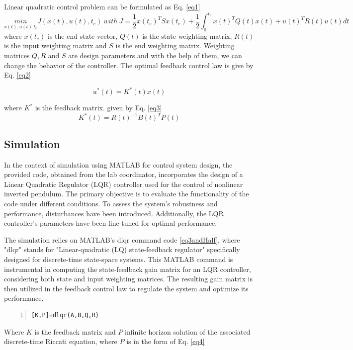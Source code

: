 Linear quadratic control problem can be formulated as Eq. \ref{eq1}
\begin{equation}\label{eq1}
\underset{x(t),u(t).t_e}{min}J(x(t),u(t),t_e)\: with \: J=\frac{1}{2}x(t_e)^TSx(t_e)+\frac{1}{2}\int_{0}^{t_e}x(t)^TQ(t)x(t)+u(t)^TR(t)u(t)dt
\end{equation}
where $x(t_e)$ is the end state vector, $Q(t)$ is the state weighting matrix, $R(t)$ is the input weighting matrix and $S$ is the end weighting matrix. Weighting matrices $Q,R$ and $S$ are design parameters and with the help of them, we can change the behavior of the controller. The optimal feedback control law is give by Eq. \ref{eq2} \cite{lqrLecture}

\begin{equation}\label{eq2}
u^*(t)=K^*(t)x(t)
\end{equation}

where $K^*$ is the feedback matrix. given by Eq. \ref{eq3} \cite{lqrLecture}
\begin{equation}\label{eq3}
K^*(t)=R(t)^{-1}B(t)^TP(t)
\end{equation}

\subsection{Simulation}
In the context of simulation using MATLAB for control system design, the provided code, obtained from the lab coordinator, incorporates the design of a Linear Quadratic Regulator (LQR) controller used for the control of nonlinear inverted pendulum. The primary objective is to evaluate the functionality of the code under different conditions. To assess the system's robustness and performance, disturbances have been introduced. Additionally, the LQR controller's parameters have been fine-tuned for optimal performance.

The simulation relies on MATLAB's dlqr command code \ref{eq3andHalf}, where "dlqr" stands for "Linear-quadratic (LQ) state-feedback regulator" specifically designed for discrete-time state-space systems. This MATLAB command is instrumental in computing the state-feedback gain matrix for an LQR controller, considering both state and input weighting matrices. The resulting gain matrix is then utilized in the feedback control law to regulate the system and optimize its performance. 
\begin{lstlisting}[numbers=left,label=eq3andHalf,caption={Discrete linear quadratic regulator implementation in MATLAB.},captionpos=b]
[K,P]=dlqr(A,B,Q,R)
\end{lstlisting}
Where $K$ is the feedback matrix and $P$ infinite horizon solution of the associated discrete-time Riccati equation, where $P$ is in the form of Eq. \ref{eq4}

